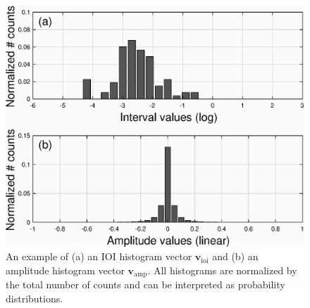 \documentclass{ws-ijsc}
\begin{document}
\begin{figure}
    \centering
    \includegraphics[width = \linewidth]{./figs/ioi_hist_examples.eps}
    \caption{An example of (a) an IOI histogram vector $\mathbf{v}_\mathrm{ioi}$ and (b) an amplitude histogram vector $\mathbf{v}_\mathrm{amp}$. All histograms are normalized by the total number of counts and can be interpreted as probability distributions.} 
    \label{fig:ioi_hist_example}
\end{figure}
\end{document}
